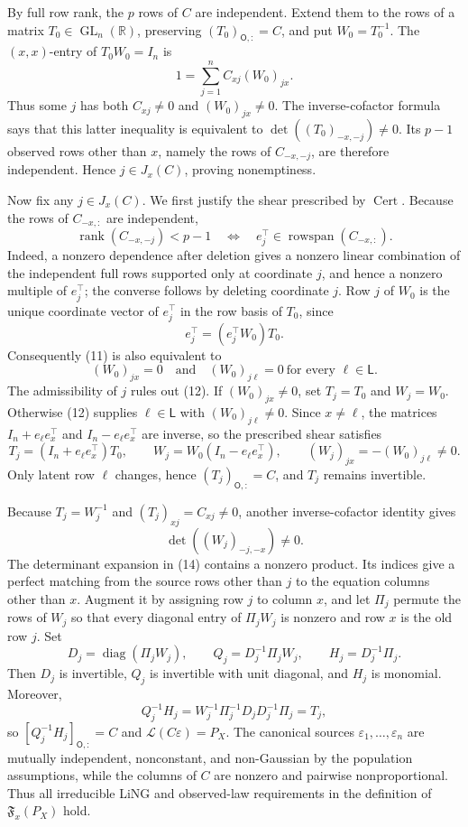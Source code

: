By full row rank, the \(p\) rows of \(C\) are independent. Extend them to the rows of a matrix \(T_0\in\operatorname{GL}_n(\mathbb R)\), preserving \((T_0)_{\mathsf O,:}=C\), and put \(W_0=T_0^{-1}\). The \((x,x)\)-entry of \(T_0W_0=I_n\) is
\[
 1=\sum_{j=1}^n C_{xj}(W_0)_{jx}. \tag{10}
\]
Thus some \(j\) has both \(C_{xj}\ne0\) and \((W_0)_{jx}\ne0\). The inverse-cofactor formula says that this latter inequality is equivalent to \(\det((T_0)_{-x,-j})\ne0\). Its \(p-1\) observed rows other than \(x\), namely the rows of \(C_{-x,-j}\), are therefore independent. Hence \(j\in J_x(C)\), proving nonemptiness.

Now fix any \(j\in J_x(C)\). We first justify the shear prescribed by \(\operatorname{Cert}\). Because the rows of \(C_{-x,:}\) are independent,
\[
 \operatorname{rank}(C_{-x,-j})<p-1
 \quad\Longleftrightarrow\quad
 e_j^\top\in\operatorname{rowspan}(C_{-x,:}). \tag{11}
\]
Indeed, a nonzero dependence after deletion gives a nonzero linear combination of the independent full rows supported only at coordinate \(j\), and hence a nonzero multiple of \(e_j^\top\); the converse follows by deleting coordinate \(j\). Row \(j\) of \(W_0\) is the unique coordinate vector of \(e_j^\top\) in the row basis of \(T_0\), since
\[
 e_j^\top=(e_j^\top W_0)T_0.
\]
Consequently (11) is also equivalent to
\[
 (W_0)_{jx}=0
 \quad\text{and}\quad
 (W_0)_{j\ell}=0\ \text{for every }\ell\in\mathsf L. \tag{12}
\]
The admissibility of \(j\) rules out (12). If \((W_0)_{jx}\ne0\), set \(T_j=T_0\) and \(W_j=W_0\). Otherwise (12) supplies \(\ell\in\mathsf L\) with \((W_0)_{j\ell}\ne0\). Since \(x\ne\ell\), the matrices \(I_n+e_\ell e_x^\top\) and \(I_n-e_\ell e_x^\top\) are inverse, so the prescribed shear satisfies
\[
 T_j=(I_n+e_\ell e_x^\top)T_0,
 \qquad
 W_j=W_0(I_n-e_\ell e_x^\top),
 \qquad
 (W_j)_{jx}=-(W_0)_{j\ell}\ne0. \tag{13}
\]
Only latent row \(\ell\) changes, hence \((T_j)_{\mathsf O,:}=C\), and \(T_j\) remains invertible.

Because \(T_j=W_j^{-1}\) and \((T_j)_{xj}=C_{xj}\ne0\), another inverse-cofactor identity gives
\[
 \det((W_j)_{-j,-x})\ne0. \tag{14}
\]
The determinant expansion in (14) contains a nonzero product. Its indices give a perfect matching from the source rows other than \(j\) to the equation columns other than \(x\). Augment it by assigning row \(j\) to column \(x\), and let \(\Pi_j\) permute the rows of \(W_j\) so that every diagonal entry of \(\Pi_jW_j\) is nonzero and row \(x\) is the old row \(j\). Set
\[
 D_j=\operatorname{diag}(\Pi_jW_j),
 \qquad Q_j=D_j^{-1}\Pi_jW_j,
 \qquad H_j=D_j^{-1}\Pi_j. \tag{15}
\]
Then \(D_j\) is invertible, \(Q_j\) is invertible with unit diagonal, and \(H_j\) is monomial. Moreover,
\[
 Q_j^{-1}H_j
 =W_j^{-1}\Pi_j^{-1}D_jD_j^{-1}\Pi_j
 =T_j, \tag{16}
\]
so \([Q_j^{-1}H_j]_{\mathsf O,:}=C\) and \(\mathcal L(C\varepsilon)=P_X\). The canonical sources \(\varepsilon_1,\ldots,\varepsilon_n\) are mutually independent, nonconstant, and non-Gaussian by the population assumptions, while the columns of \(C\) are nonzero and pairwise nonproportional. Thus all irreducible LiNG and observed-law requirements in the definition of \(\mathfrak F_x(P_X)\) hold.

